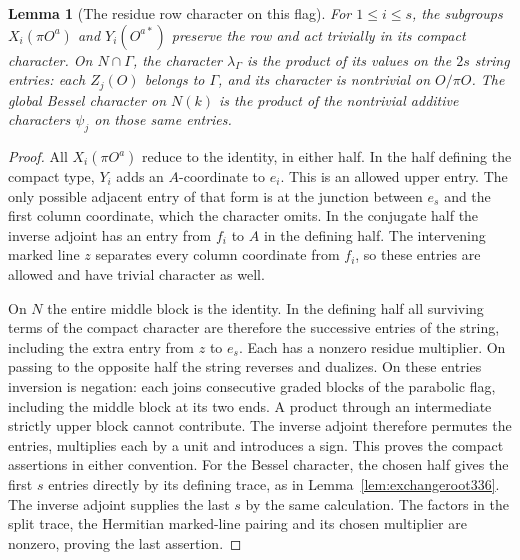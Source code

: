 \documentclass[a4paper,11pt]{article}
\newtheorem{lemma}[proposition]{Lemma}
\theoremstyle{definition}
\theoremstyle{remark}
\numberwithin{equation}{section}
\begin{document}
\begin{lemma}[The residue row character on this flag]\label{lem:auxiliaryroots339}
For \(1\le i\le s\), the subgroups \(X_i(\pi O^a)\) and
\(Y_i(O^{a*})\) preserve the row and act trivially in its compact
character. On \(N\cap\Gamma\), the character \(\lambda_\Gamma\)
is the product of its values on the \(2s\) string entries:
each \(Z_j(O)\) belongs to \(\Gamma\), and its character is
nontrivial on \(O/\pi O\). The global Bessel character on \(N(k)\)
is the product of the nontrivial additive characters \(\psi_j\)
on those same entries.
\end{lemma}
\begin{proof}
All \(X_i(\pi O^a)\) reduce to the identity, in either half.
In the half defining the compact type, \(Y_i\) adds an \(A\)-coordinate
to \(e_i\). This is an allowed upper entry. The only possible
adjacent entry of that form is at the junction between \(e_s\)
and the first column coordinate, which the character omits. In
the conjugate half the inverse adjoint has an entry from \(f_i\)
to \(A\) in the defining half. The intervening marked line \(z\)
separates every column coordinate from \(f_i\), so these entries
are allowed and have trivial character as well.

On \(N\) the entire middle block is the identity. In the defining
half all surviving terms of the compact character are therefore
the successive entries of the string, including the extra entry
from \(z\) to \(e_s\). Each has a nonzero residue multiplier. On
passing to the opposite half the string reverses and dualizes.
On these entries inversion is negation: each joins consecutive
graded blocks of the parabolic flag, including the middle block
at its two ends. A product through an intermediate strictly
upper block cannot contribute. The inverse adjoint therefore
permutes the entries, multiplies each by a unit and introduces
a sign. This proves the compact assertions in either convention.
For the Bessel character, the chosen half gives the first \(s\)
entries directly by its defining trace, as in
Lemma~\ref{lem:exchangeroot336}. The inverse adjoint supplies the
last \(s\) by the same calculation. The factors in the split trace,
the Hermitian marked-line pairing and its chosen multiplier are
nonzero, proving the last assertion.
\end{proof}
\end{document}
